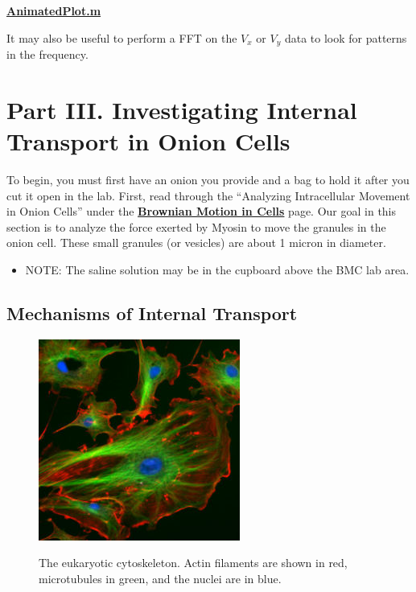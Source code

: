 \documentclass{../lab}
\begin{document}
\href{http://experimentationlab.berkeley.edu/sites/default/files/matlab\_fitting/AnimatedPlot.m}{\textbf{AnimatedPlot.m}}

It may also be useful to perform a FFT on the $V_x$ or $V_y$ data to look for patterns in the frequency.

\section{Part III. Investigating Internal Transport in Onion Cells}

To begin, you must first have an onion you provide and a bag to hold it after you cut it open in the lab. First, read through the ``Analyzing Intracellular Movement in Onion Cells'' under the \href{http://experimentationlab.berkeley.edu/BMC}{\textbf{Brownian Motion in Cells}} page. Our goal in this section is to analyze the force exerted by Myosin to move the granules in the onion cell. These small granules (or vesicles) are about 1 micron in diameter.

\begin{itemize}
    \item NOTE: The saline solution may be in the cupboard above the BMC lab area.

\end{itemize}

\subsection{Mechanisms of Internal Transport}

\begin{figure}[h]
    \centering
    \href{http://experimentationlab.berkeley.edu/sites/default/files/images/250px-BMC_Cytoskeleton.jpg}{\includegraphics[width=0.5\linewidth]{images/250px-BMC_Cytoskeleton.jpg}}
    \caption{The eukaryotic cytoskeleton. Actin filaments are shown in red, microtubules in green, and the nuclei are in blue.}
    \label{fig:250px-BMC_Cytoskeleton}
\end{figure}
\end{document}
